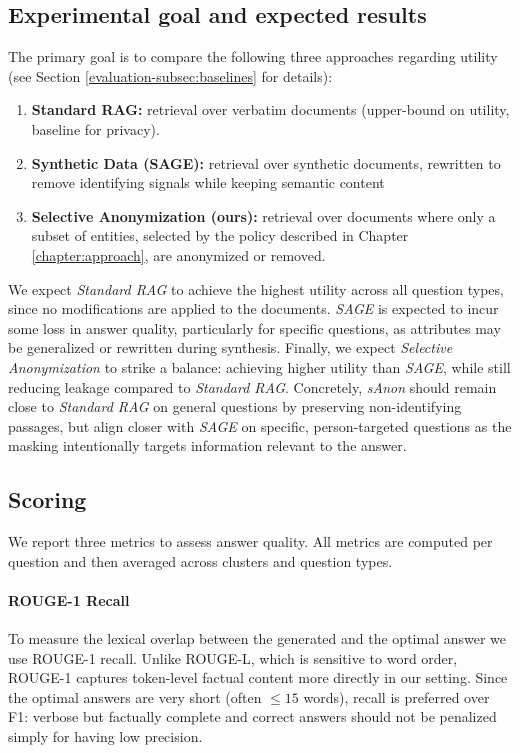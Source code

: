 \subsection{Experimental goal and expected results}
The primary goal is to compare the following three approaches regarding utility (see Section \ref{evaluation-subsec:baselines} for details):
\begin{enumerate}
\item \textbf{Standard RAG:} retrieval over verbatim documents (upper-bound on utility, baseline for privacy).
\item \textbf{Synthetic Data (SAGE):} retrieval over synthetic documents, rewritten to remove identifying signals while keeping semantic content
\item \textbf{Selective Anonymization (ours):} retrieval over documents where only a subset of entities, selected by the policy described in Chapter \ref{chapter:approach}, are anonymized or removed.
\end{enumerate}

We expect \textit{Standard RAG} to achieve the highest utility across all question types, since no modifications are applied to the documents. \textit{SAGE} is expected to incur some loss in answer quality, particularly for specific questions, as attributes may be generalized or rewritten during synthesis. Finally, we expect \textit{Selective Anonymization} to strike a balance: achieving higher utility than \textit{SAGE}, while still reducing leakage compared to \textit{Standard RAG}. Concretely, \textit{sAnon} should remain close to \textit{Standard RAG} on general questions by preserving non-identifying passages, but align closer with \textit{SAGE} on specific, person-targeted questions as the masking intentionally targets information relevant to the answer. 


\subsection{Scoring} 
We report three metrics to assess answer quality. All metrics are computed per question and then averaged across clusters and question types.

\paragraph{ROUGE-1 Recall} To measure the lexical overlap between the generated and the optimal answer we use ROUGE-1 recall. Unlike ROUGE-L, which is sensitive to word order, ROUGE-1 captures token-level factual content more directly in our setting. Since the optimal answers are very short (often $\leq 15$ words), recall is preferred over F1: verbose but factually complete and correct answers should not be penalized simply for having low precision.


